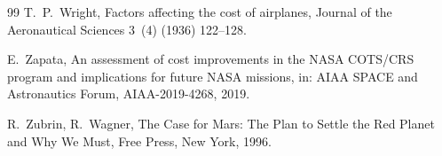 \documentclass[5p,twocolumn]{elsarticle}
\begin{document}
\begin{thebibliography}{99}
T.~P.~Wright,
\newblock Factors affecting the cost of airplanes,
\newblock Journal of the Aeronautical Sciences 3~(4) (1936) 122--128.

E.~Zapata,
\newblock An assessment of cost improvements in the NASA COTS/CRS program and implications for future NASA missions,
\newblock in: AIAA SPACE and Astronautics Forum, AIAA-2019-4268, 2019.

R.~Zubrin, R.~Wagner,
\newblock The Case for Mars: The Plan to Settle the Red Planet and Why We Must,
\newblock Free Press, New York, 1996.

\end{thebibliography}
\end{document}
